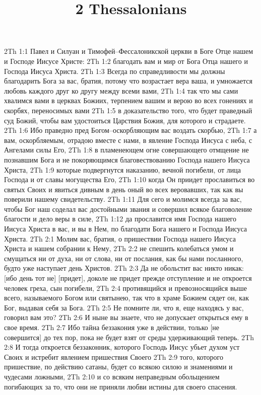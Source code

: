 

\title{2 Thessalonians}

2Th 1:1  Павел и Силуан и Тимофей--Фессалоникской церкви в Боге Отце нашем и Господе Иисусе Христе:
2Th 1:2  благодать вам и мир от Бога Отца нашего и Господа Иисуса Христа.
2Th 1:3  Всегда по справедливости мы должны благодарить Бога за вас, братия, потому что возрастает вера ваша, и умножается любовь каждого друг ко другу между всеми вами,
2Th 1:4  так что мы сами хвалимся вами в церквах Божиих, терпением вашим и верою во всех гонениях и скорбях, переносимых вами
2Th 1:5  в доказательство того, что будет праведный суд Божий, чтобы вам удостоиться Царствия Божия, для которого и страдаете.
2Th 1:6  Ибо праведно пред Богом--оскорбляющим вас воздать скорбью,
2Th 1:7  а вам, оскорбляемым, отрадою вместе с нами, в явление Господа Иисуса с неба, с Ангелами силы Его,
2Th 1:8  в пламенеющем огне совершающего отмщение не познавшим Бога и не покоряющимся благовествованию Господа нашего Иисуса Христа,
2Th 1:9  которые подвергнутся наказанию, вечной погибели, от лица Господа и от славы могущества Его,
2Th 1:10  когда Он приидет прославиться во святых Своих и явиться дивным в день оный во всех веровавших, так как вы поверили нашему свидетельству.
2Th 1:11  Для сего и молимся всегда за вас, чтобы Бог наш соделал вас достойными звания и совершил всякое благоволение благости и дело веры в силе,
2Th 1:12  да прославится имя Господа нашего Иисуса Христа в вас, и вы в Нем, по благодати Бога нашего и Господа Иисуса Христа.
2Th 2:1  Молим вас, братия, о пришествии Господа нашего Иисуса Христа и нашем собрании к Нему,
2Th 2:2  не спешить колебаться умом и смущаться ни от духа, ни от слова, ни от послания, как бы нами посланного, будто уже наступает день Христов.
2Th 2:3  Да не обольстит вас никто никак: [ибо день тот не] [придет], доколе не придет прежде отступление и не откроется человек греха, сын погибели,
2Th 2:4  противящийся и превозносящийся выше всего, называемого Богом или святынею, так что в храме Божием сядет он, как Бог, выдавая себя за Бога.
2Th 2:5  Не помните ли, что я, еще находясь у вас, говорил вам это?
2Th 2:6  И ныне вы знаете, что не допускает открыться ему в свое время.
2Th 2:7  Ибо тайна беззакония уже в действии, только [не совершится] до тех пор, пока не будет взят от среды удерживающий теперь.
2Th 2:8  И тогда откроется беззаконник, которого Господь Иисус убьет духом уст Своих и истребит явлением пришествия Своего
2Th 2:9  того, которого пришествие, по действию сатаны, будет со всякою силою и знамениями и чудесами ложными,
2Th 2:10  и со всяким неправедным обольщением погибающих за то, что они не приняли любви истины для своего спасения.
